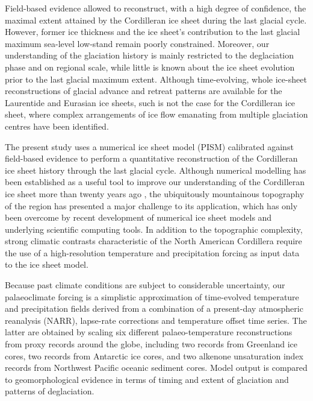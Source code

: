 Field-based evidence allowed to reconstruct, with a high degree of confidence,
the maximal extent attained by the Cordilleran ice sheet during the last glacial
cycle. However, former ice thickness and the ice sheet's contribution to the
last glacial maximum sea-level low-stand remain poorly constrained. Moreover,
our understanding of the glaciation history is mainly restricted to the
deglaciation phase and on regional scale, while little is known about the ice
sheet evolution prior to the last glacial maximum extent. Although
time-evolving, whole ice-sheet reconstructions of glacial advance and retreat
patterns are available for the Laurentide and Eurasian ice sheets, such is not
the case for the Cordilleran ice sheet, where complex arrangements of ice flow
emanating from multiple glaciation centres have been identified.

The present study uses a numerical ice sheet model (PISM) calibrated against
field-based evidence to perform a quantitative reconstruction of the
Cordilleran ice sheet history through the last glacial cycle. Although
numerical modelling has been established as a useful tool to improve our
understanding
of the Cordilleran ice sheet more than twenty years ago \aref, the ubiquitously
mountainous topography of the region has presented a major challenge to its
application, which has only been overcome by recent development of numerical ice
sheet models and underlying scientific computing tools. In addition to the topographic
complexity, strong climatic contrasts characteristic of the North American
Cordillera require the use of a high-resolution temperature and precipitation
forcing as input data to the ice sheet model.

Because past climate conditions are subject to considerable uncertainty, our
palaeoclimate forcing is a simplistic approximation of time-evolved temperature
and precipitation fields derived from a combination of a present-day
atmospheric reanalysis (NARR), lapse-rate corrections and temperature offset
time series. The latter are
obtained by scaling six different palaeo-temperature reconstructions from
proxy records around the globe, including two  records from
Greenland ice cores, two  records from Antarctic ice cores,
and two alkenone unsaturation index records from Northwest Pacific oceanic
sediment cores. Model output is compared to geomorphological evidence in terms
of timing and extent of glaciation and patterns of deglaciation.


